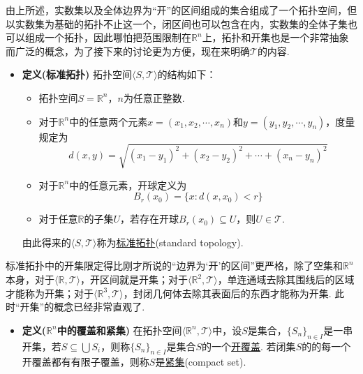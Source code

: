 由上所述，实数集以及全体边界为“开”的区间组成的集合组成了一个拓扑空间，但以实数集为基础的拓扑不止这一个，闭区间也可以包含在内，实数集的全体子集也可以组成一个拓扑，因此哪怕把范围限制在\(\mathbb{R}^n\)上，拓扑和开集也是一个非常抽象而广泛的概念，为了接下来的讨论更为方便，现在来明确\(\mathcal{T}\)的内容.

\begin{itemize}
    \item [\(\bullet\)] \textbf{定义(标准拓扑)}
    \newline
    拓扑空间\(\langle S, \mathcal{T} \rangle\)的结构如下：
    \begin{itemize}
        \item[(1)] 拓扑空间\(S=\mathbb{R}^n\)，\(n\)为任意正整数.
        \item[(2)] 对于\(\mathbb{R}^n\)中的任意两个元素\(x=(x_1, x_2, \cdots, x_n)\)和\(y=(y_1,y_2,\cdots,y_n)\)，度量规定为
        \[d(x,y)=\sqrt{(x_1-y_1)^2+(x_2-y_2)^2+\cdots+(x_n-y_n)^2}\]
        \item[(3)] 对于\(\mathbb{R}^n\)中的任意元素，开球定义为
        \[B_r(x_0) = \{x: d(x,x_0) < r\}\]
        \item[(4)] 对于任意\(\mathbb{R}\)的子集\(U\)，若存在开球\(B_r(x_0) \subseteq U\)，则\(U \in \mathcal{T}\).
    \end{itemize}
    由此得来的\(\langle S, \mathcal{T} \rangle\)称为\uline{标准拓扑}(standard topology).
\end{itemize}

标准拓扑中的开集限定得比刚才所说的“边界为‘开’的区间”更严格，除了空集和\(\mathbb{R}^n\)本身，对于\(\langle \mathbb{R}, \mathcal{T} \rangle\)，开区间就是开集；对于\(\langle \mathbb{R}^2, \mathcal{T} \rangle\)，单连通域去除其围线后的区域才能称为开集；对于\(\langle \mathbb{R}^3, \mathcal{T} \rangle\)，封闭几何体去除其表面后的东西才能称为开集. 此时“开集”的概念已经非常直观了.

\begin{itemize}
    \item [\(\bullet\)] \textbf{定义(\(\mathbb{R}^n\)中的覆盖和紧集)}
    \newline
    在拓扑空间\(\langle \mathbb{R}^n,\mathcal{T} \rangle \)中，设\(S\)是集合，\(\{S_n\}_{n \in I}\)是一串开集，若\(S \subseteq \bigcup S_i\)，则称\(\{S_n\}_{n \in I}\)是集合\(S\)的一个\uline{开覆盖}.
    \newline
    若闭集\(S\)的的每一个开覆盖都有有限子覆盖，则称\(S\)是\uline{紧集}(compact set).
\end{itemize}

